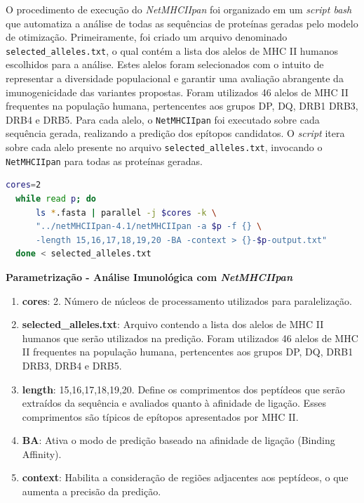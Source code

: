 O procedimento de execução do \textit{NetMHCIIpan} foi organizado em um \textit{script bash} 
que automatiza a análise de todas as sequências de proteínas geradas pelo modelo de otimização. 
Primeiramente, foi criado um arquivo denominado \texttt{selected\_alleles.txt}, 
o qual contém a lista dos alelos de MHC II humanos escolhidos para a análise. 
Estes alelos foram selecionados com o intuito de representar a diversidade populacional e garantir uma avaliação abrangente da imunogenicidade das variantes propostas.
Foram utilizados 46 alelos de MHC II frequentes na população humana, pertencentes aos grupos DP, DQ, DRB1 DRB3, DRB4 e DRB5.
Para cada alelo,
o \texttt{NetMHCIIpan} foi executado sobre cada sequência gerada,
realizando a predição dos epítopos candidatos. 
O \textit{script} itera sobre cada alelo presente no arquivo \texttt{selected\_alleles.txt}, 
invocando o \texttt{NetMHCIIpan} para todas as proteínas geradas.

\begin{lstlisting}[language=bash, breaklines=true, frame=single, backgroundcolor=\color{lightgray}]
  cores=2  
  while read p; do
      ls *.fasta | parallel -j $cores -k \
      "../netMHCIIpan-4.1/netMHCIIpan -a $p -f {} \
      -length 15,16,17,18,19,20 -BA -context > {}-$p-output.txt"
  done < selected_alleles.txt
\end{lstlisting}

\textbf{Parametrização - Análise Imunológica com \textit{NetMHCIIpan}}
\begin{enumerate}
    \item \textbf{cores}: 2. Número de núcleos de processamento utilizados para paralelização.
    \item \textbf{selected\_alleles.txt}: Arquivo contendo a lista dos alelos de MHC II humanos que serão utilizados na predição. Foram utilizados 46 alelos de MHC II frequentes na população humana, pertencentes aos grupos DP, DQ, DRB1 DRB3, DRB4 e DRB5.
    \item \textbf{length}: 15,16,17,18,19,20. Define os comprimentos dos peptídeos que serão extraídos da sequência e avaliados quanto à afinidade de ligação. Esses comprimentos são típicos de epítopos apresentados por MHC II.
    \item \textbf{BA}: Ativa o modo de predição baseado na afinidade de ligação (Binding Affinity).
    \item \textbf{context}: Habilita a consideração de regiões adjacentes aos peptídeos, o que aumenta a precisão da predição.
\end{enumerate}

